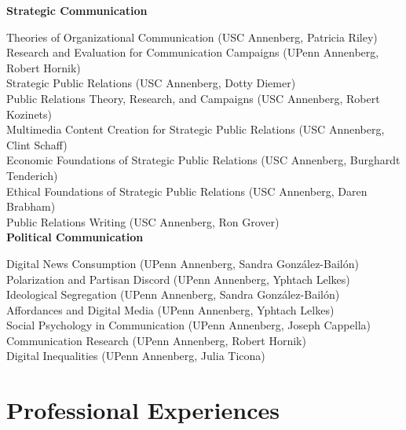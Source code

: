 \documentclass[12pt, letterpaper]{article}
\newcommand{\years}[1]{\marginnote{\normalsize #1}}
\begin{document}
\textbf{Strategic Communication}

  \years{} Theories of Organizational Communication (USC Annenberg, Patricia Riley)\\
  \years{} Research and Evaluation for Communication Campaigns (UPenn Annenberg, Robert Hornik)\\
  \years{} Strategic Public Relations (USC Annenberg, Dotty Diemer)\\
  \years{} Public Relations Theory, Research, and Campaigns (USC Annenberg, Robert Kozinets)\\
  \years{} Multimedia Content Creation for Strategic Public Relations (USC Annenberg, Clint Schaff)\\
  \years{} Economic Foundations of Strategic Public Relations (USC Annenberg, Burghardt Tenderich)\\
  \years{} Ethical Foundations of Strategic Public Relations (USC Annenberg, Daren Brabham)\\
  \years{} Public Relations Writing (USC Annenberg, Ron Grover)\\

\textbf{Political Communication}

  \years{} Digital News Consumption (UPenn Annenberg, Sandra González-Bailón)\\
  \years{} Polarization and Partisan Discord (UPenn Annenberg, Yphtach Lelkes)\\
  \years{} Ideological Segregation (UPenn Annenberg, Sandra González-Bailón)\\
  \years{} Affordances and Digital Media (UPenn Annenberg, Yphtach Lelkes)\\
  \years{} Social Psychology in Communication (UPenn Annenberg, Joseph Cappella)\\
  \years{} Communication Research (UPenn Annenberg, Robert Hornik)\\
  \years{} Digital Inequalities (UPenn Annenberg, Julia Ticona)


\section*{Professional Experiences}
\end{document}
